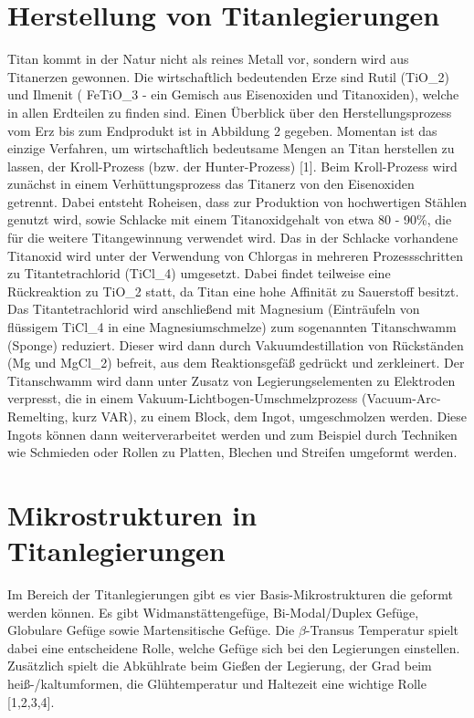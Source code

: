 \section{Herstellung von Titanlegierungen}
Titan kommt in der Natur nicht als reines Metall vor, sondern wird aus Titanerzen gewonnen. Die wirtschaftlich bedeutenden Erze sind Rutil (TiO_2) und Ilmenit ( FeTiO_3 - ein Gemisch aus Eisenoxiden und Titanoxiden), welche in allen Erdteilen zu finden sind. Einen Überblick über den Herstellungsprozess vom Erz bis zum Endprodukt ist in Abbildung 2 gegeben. Momentan ist das einzige Verfahren, um wirtschaftlich bedeutsame Mengen an Titan herstellen zu lassen, der Kroll-Prozess (bzw. der Hunter-Prozess) [1]. Beim Kroll-Prozess wird zunächst in einem Verhüttungsprozess das Titanerz von den Eisenoxiden getrennt. Dabei entsteht Roheisen, dass zur Produktion von hochwertigen Stählen genutzt wird, 
sowie Schlacke mit einem Titanoxidgehalt von etwa 80 - 90\%, die für die weitere Titangewinnung verwendet wird. Das in der Schlacke vorhandene Titanoxid wird unter der Verwendung von Chlorgas in mehreren Prozessschritten zu Titantetrachlorid (TiCl_4) umgesetzt. Dabei findet teilweise eine Rückreaktion zu TiO_2 statt, da Titan eine hohe Affinität zu Sauerstoff besitzt. Das Titantetrachlorid wird anschließend mit Magnesium (Einträufeln von flüssigem TiCl_4 in eine Magnesiumschmelze) zum sogenannten Titanschwamm (Sponge) reduziert. Dieser wird dann durch Vakuumdestillation von Rückständen (Mg und MgCl_2) befreit, aus dem Reaktionsgefäß gedrückt und zerkleinert. Der Titanschwamm wird dann unter Zusatz von Legierungselementen zu Elektroden verpresst, die in einem Vakuum-Lichtbogen-Umschmelzprozess (Vacuum-Arc-Remelting, kurz VAR), zu einem Block, dem Ingot, umgeschmolzen werden. Diese Ingots können dann weiterverarbeitet werden und zum Beispiel durch Techniken wie Schmieden oder Rollen zu Platten, Blechen und Streifen umgeformt werden. 



\section{Mikrostrukturen in Titanlegierungen} 
Im Bereich der Titanlegierungen gibt es vier Basis-Mikrostrukturen die geformt werden können. Es gibt Widmanstättengefüge, Bi-Modal/Duplex Gefüge, Globulare Gefüge sowie Martensitische Gefüge. Die $\beta$-Transus Temperatur spielt dabei eine entscheidene Rolle, welche Gefüge sich bei den Legierungen einstellen. Zusätzlich spielt die Abkühlrate beim Gießen der Legierung, der Grad beim heiß-/kaltumformen, die Glühtemperatur und Haltezeit eine wichtige Rolle [1,2,3,4]. 


